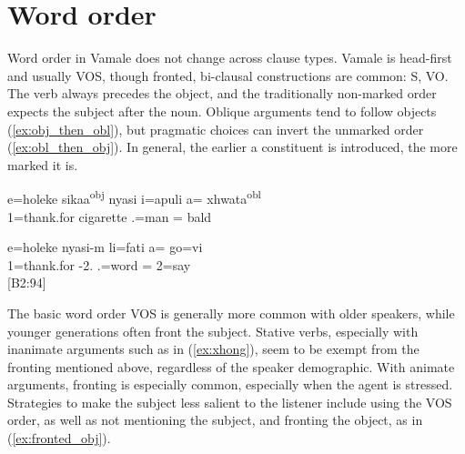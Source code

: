 \section{Word order}
\label{sec:alignment}
Word order in Vamale does not change across clause types. Vamale is head-first and usually VOS, though fronted, bi-clausal constructions are common: S, VO. The verb always precedes the object, and the traditionally non-marked order expects the subject after the noun. Oblique arguments tend to follow objects (\ref{ex:obj_then_obl}), but pragmatic choices can invert the unmarked order (\ref{ex:obl_then_obj}). In general, the earlier a constituent is introduced, the more marked it is. %



\ea\label{ex:obj_then_obl}
\gll e=holeke {\ob}sikaa{\cb}\textsuperscript{obj} {\ob}nyasi i=apuli a= xhwata{\cb}\textsuperscript{obl}\\ 
 1=thank.for cigarette  .=man = bald\\ 
\glt {}
 \z
 
\ea\label{ex:obl_then_obj}
\gll e=holeke nyasi-m li=fati a= go=vi\\ 
 1=thank.for -2. .=word = 2=say\\ 
\glt {} {[B2:94]}
\z

%
%


The basic word order VOS is generally more common with older speakers, while younger generations often front the subject. Stative verbs, especially with inanimate arguments such as in (\ref{ex:xhong}), seem to be exempt from the fronting mentioned above, regardless of the speaker demographic. With animate arguments, fronting is especially common, especially when the agent is stressed. Strategies to make the subject less salient to the listener include using the VOS order, as well as not mentioning the subject, and fronting the object, as in (\ref{ex:fronted_obj}).


